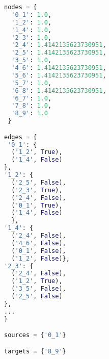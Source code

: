 \begin{lstlisting}[language=Python]
nodes = {
  '0_1': 1.0, 
  '1_2': 1.0, 
  '1_4': 1.0,
  '2_3': 1.0, 
  '2_4': 1.4142135623730951,
  '2_5': 1.4142135623730951, 
  '3_5': 1.0,
  '4_6': 1.4142135623730951, 
  '5_6': 1.4142135623730951, 
  '5_7': 1.0, 
  '6_8': 1.4142135623730951,
  '6_7': 1.0, 
  '7_8': 1.0, 
  '8_9': 1.0
 } 

edges = {
 '0_1': {
  ('1_2', True), 
  ('1_4', False)
}, 
'1_2': {
  ('2_5', False), 
  ('2_3', True), 
  ('2_4', False), 
  ('0_1', True), 
  ('1_4', False)
  }, 
'1_4': {
  ('2_4', False), 
  ('4_6', False), 
  ('0_1', False), 
  ('1_2', False)}, 
'2_3': {
  ('2_4', False), 
  ('1_2', True), 
  ('3_5', False), 
  ('2_5', False)
}, 
...
} 

sources = {'0_1'}

targets = {'8_9'}
\end{lstlisting}


